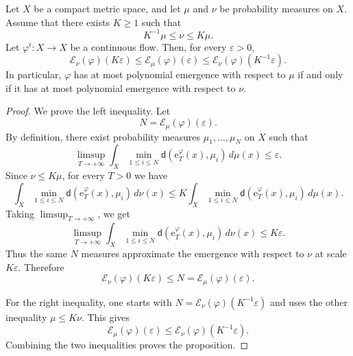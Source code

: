 \documentclass[10pt,a4paper]{amsart}
\begin{document}
\begin{prop}\label{prop: emergencia pol nao muda para medidas equiv}
Let $X$ be a compact metric space, and let $\mu$ and $\nu$ be probability
measures on $X$. Assume that there exists $K\geq 1$ such that
\begin{equation*}
K^{-1}\mu\leq \nu\leq K\mu.
\end{equation*}
Let $\varphi^{t}\colon X \to X$ be a continuous flow. Then, for every
$\varepsilon>0$,
\begin{equation*}
\mathcal{E}_{\nu}(\varphi)(K\varepsilon)
\leq
\mathcal{E}_{\mu}(\varphi)(\varepsilon)
\leq
\mathcal{E}_{\nu}(\varphi)(K^{-1}\varepsilon).
\end{equation*}
In particular, $\varphi$ has at most polynomial emergence with respect to
$\mu$ if and only if it has at most polynomial emergence with respect to
$\nu$.
\end{prop}

\begin{proof}
We prove the left inequality. Let
\begin{equation*}
N=\mathcal{E}_{\mu}(\varphi)(\varepsilon).
\end{equation*}
By definition, there exist probability measures
$\mu_1,\dots,\mu_N$ on $X$ such that
\begin{equation*}
\limsup_{T\to+\infty}
\int_X
\min_{1\leq i\leq N}
\mathsf d(\mathrm{e}^{\varphi}_{T}(x),\mu_i)\,d\mu(x)
\leq
\varepsilon.
\end{equation*}
Since $\nu\leq K\mu$, for every $T>0$ we have
\begin{equation*}
\int_X
\min_{1\leq i\leq N}
\mathsf d(\mathrm{e}^{\varphi}_{T}(x),\mu_i)\,d\nu(x)
\leq
K
\int_X
\min_{1\leq i\leq N}
\mathsf d(\mathrm{e}^{\varphi}_{T}(x),\mu_i)\,d\mu(x).
\end{equation*}
Taking $\limsup_{T\to+\infty}$, we get
\begin{equation*}
\limsup_{T\to+\infty}
\int_X
\min_{1\leq i\leq N}
\mathsf d(\mathrm{e}^{\varphi}_{T}(x),\mu_i)\,d\nu(x)
\leq
K\varepsilon.
\end{equation*}
Thus the same $N$ measures approximate the emergence with respect to $\nu$ at
scale $K\varepsilon$. Therefore
\begin{equation*}
\mathcal{E}_{\nu}(\varphi)(K\varepsilon)
\leq
N
=
\mathcal{E}_{\mu}(\varphi)(\varepsilon).
\end{equation*}

For the right inequality, one starts with
$N=\mathcal{E}_{\nu}(\varphi)(K^{-1}\varepsilon)$ and uses the other inequality
$\mu\leq K\nu$. This gives
\begin{equation*}
\mathcal{E}_{\mu}(\varphi)(\varepsilon)
\leq
\mathcal{E}_{\nu}(\varphi)(K^{-1}\varepsilon).
\end{equation*}
Combining the two inequalities proves the proposition.
\end{proof}
\end{document}
